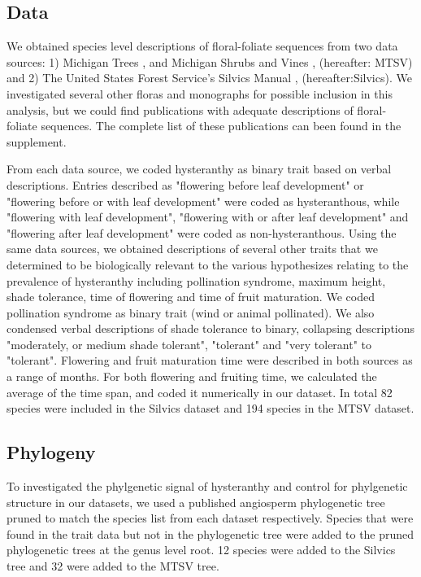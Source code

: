 \documentclass{article}\usepackage[]{graphicx}\usepackage[]{color}
\begin{document}
\begin{itemize}
\subsection*{Data}
We obtained species level descriptions of floral-foliate sequences from two data sources: 1) Michigan Trees \citep{Barnes}, and Michigan Shrubs and Vines \citep{Barnes}, (hereafter: MTSV) and 2) The United States Forest Service's Silvics Manual \citep{}, (hereafter:Silvics). We investigated several other floras and monographs for possible inclusion in this analysis, but we could find publications with adequate descriptions of floral-foliate sequences. The complete list of these publications can been found in the supplement.
\par From each data source, we coded hysteranthy as binary trait based on verbal descriptions. Entries described as "flowering before leaf development" or "flowering before or with leaf development" were coded as hysteranthous, while "flowering with leaf development", "flowering with or after leaf development" and "flowering after leaf development" were coded as non-hysteranthous. Using the same data sources, we obtained descriptions of several other traits that we determined to be biologically relevant to the various hypothesizes relating to the prevalence of hysteranthy including pollination syndrome, maximum height, shade tolerance, time of flowering and time of fruit maturation. We coded pollination syndrome as binary trait (wind or animal pollinated). We also condensed verbal descriptions of shade tolerance to binary, collapsing descriptions "moderately, or medium shade tolerant", "tolerant" and "very tolerant" to "tolerant". Flowering and fruit maturation time were described in both sources as a range of months. For both flowering and fruiting time, we calculated the average of the time span, and coded it numerically in our dataset. In total 82 species were included in the Silvics dataset and 194 species in the MTSV dataset.
\subsection*{Phylogeny}
To investigated the phylgenetic signal of hysteranthy and control for phylgenetic structure in our datasets, we used a published angiosperm phylogenetic tree \citep{Zanne2014} pruned to match the species list from each dataset respectively. Species that were found in the trait data but not in the phylogenetic tree were added to the pruned phylogenetic trees at the genus level root. 12 species were added to the Silvics tree and 32 were added to the MTSV tree.

\end{itemize}
\end{document}

